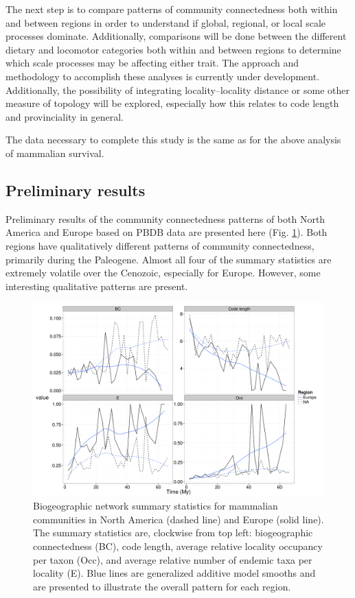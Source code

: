 \documentclass[12pt,letterpaper]{article}
\begin{document}
The next step is to compare patterns of community connectedness both within and between regions in order to understand if global, regional, or local scale processes dominate. Additionally, comparisons will be done between the different dietary and locomotor categories both within and between regions to determine which scale processes may be affecting either trait. The approach and methodology to accomplish these analyses is currently under development. Additionally, the possibility of integrating locality--locality distance or some other measure of topology will be explored, especially how this relates to code length and provinciality in general.

The data necessary to complete this study is the same as for the above analysis of mammalian survival.

\subsection{Preliminary results} \label{mamcomres}
Preliminary results of the community connectedness patterns of both North America and Europe based on PBDB data are presented here (Fig. \ref{fig:mam_tot}). Both regions have qualitatively different patterns of community connectedness, primarily during the Paleogene. Almost all four of the summary statistics are extremely volatile over the Cenozoic, especially for Europe. However, some interesting qualitative patterns are present.

\begin{figure}[t]
  \begin{center}
    \includegraphics[height = 0.4\textheight, keepaspectratio = true]{figure/gen_bin}
  \end{center}
  \caption{Biogeographic network summary statistics for mammalian communities in North America (dashed line) and Europe (solid line). The summary statistics are, clockwise from top left: biogeographic connectedness (BC), code length, average relative locality occupancy per taxon (Occ), and average relative number of endemic taxa per locality (E). Blue lines are generalized additive model smooths and are presented to illustrate the overall pattern for each region.} 
  \label{fig:mam_tot}
\end{figure}
\end{document}
